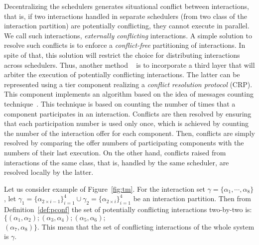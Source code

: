Decentralizing the schedulers generates situational conflict between interactions, that is, 
if two interactions handled in separate schedulers (from two class of the interaction partition)
are potentially conflicting, they cannot execute in parallel. We call such interactions,
\emph{externally conflicting} interactions. 
A simple solution to resolve such conflicts is to enforce
a \emph{conflict-free} partitioning of interactions. In spite of that, this solution will 
restrict the choice for distributing interactions across schedulers. Thus, another method
~\cite{jean,ahlem_these} is to incorporate a third layer that will arbiter the execution of 
potentially 
conflicting interactions. The latter can be represented using a tier component realizing 
a \emph{conflict resolution protocol} (CRP). This
component implements an algorithm based on the idea of messages counting technique~\cite{msg_cnt}.
This technique is based on counting the number of times that a component participates in an 
interaction. Conflicts are then resolved by ensuring that each participation number is used 
only once, which is achieved by counting the number of the interaction offer for each 
component. Then, conflicts are simply resolved by comparing the offer numbers of participating
components with the numbers of their last execution.
On the other hand, conflicts raised from interactions of the same class, that is, handled by 
the same scheduler, are resolved locally by the latter.
\begin{example}\label{exp:partition}
  Let us consider example of Figure~\ref{fig:tm}. For the interaction set $\gamma=\{\alpha_1,
  \cdots,\alpha_8\}$, let $\gamma_1=\{\alpha_{2\times i-1}\}_{i=1}^4\cup\gamma_2=
  \{\alpha_{2\times i}\}_{i=1}^4$ be an interaction partition. Then from 
  Definition~\ref{def:pconf} the set of potentially conflicting interactions two-by-two is:
  $\{(\alpha_1,\alpha_2);(\alpha_3,\alpha_4);(\alpha_5,\alpha_6);$\\$(\alpha_7,\alpha_8)\}$.
  This mean that the set of conflicting interactions of the whole system is $\gamma$.
\end{example}

